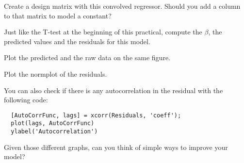 \documentclass[a4paper,10pt]{article}
\begin{document}
Create a design matrix with this convolved regressor. Should you add a column to that matrix to model a constant?

Just like the T-test at the beginning of this practical, compute the $\beta$, the predicted values and the residuals for this model.

Plot the predicted and the raw data on the same figure.

Plot the normplot of the residuals.

You can also check if there is any autocorrelation in the residual with the following code:
\begin{verbatim}
  [AutoCorrFunc, lags] = xcorr(Residuals, 'coeff');
  plot(lags, AutoCorrFunc)
  ylabel('Autocorrelation')
\end{verbatim}

Given those different graphs, can you think of simple ways to improve your model? %
\end{document}
